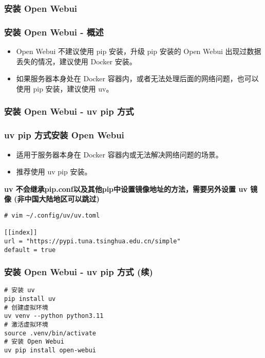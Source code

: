 \begin{frame}[fragile]
	\frametitle{安装 Open Webui}
	\subsubsection{安装 Open Webui - 概述}
	\begin{itemize}
		\item Open Webui 不建议使用 pip 安装，升级 pip 安装的 Open Webui 出现过数据丢失的情况，建议使用 Docker 安装。
		\item 如果服务器本身处在 Docker 容器内，或者无法处理后面的网络问题，也可以使用 pip 安装，建议使用 uv。
	\end{itemize}
\end{frame}

\begin{frame}[fragile]
	\frametitle{安装 Open Webui - uv pip 方式}
	\subsubsection{uv pip 方式安装 Open Webui}
	\begin{itemize}
		\item 适用于服务器本身在 Docker 容器内或无法解决网络问题的场景。
		\item 推荐使用 uv pip 安装。
	\end{itemize}
	\textbf{uv 不会继承pip.conf以及其他pip中设置镜像地址的方法，需要另外设置 uv 镜像 (非中国大陆地区可以跳过)}

	\begin{lstlisting}
# vim ~/.config/uv/uv.toml

[[index]]
url = "https://pypi.tuna.tsinghua.edu.cn/simple"
default = true
\end{lstlisting}
\end{frame}

\begin{frame}[fragile]
	\frametitle{安装 Open Webui - uv pip 方式 (续)}
	\begin{lstlisting}
# 安装 uv
pip install uv
# 创建虚拟环境
uv venv --python python3.11
# 激活虚拟环境
source .venv/bin/activate
# 安装 Open Webui
uv pip install open-webui
\end{lstlisting}
\end{frame}


